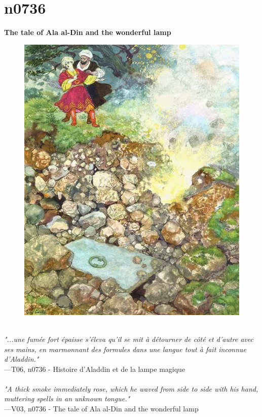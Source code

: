 \documentclass[../Carre_nights.tex]{subfiles}
\begin{document}
\newpage

\section{n0736}
\textbf{\Large{The tale of Ala al-Din and the wonderful lamp}} \\

\begin{figure}[ht]
\centering
\includegraphics[height=\figsize]{illustrations/volume_6/T06, n0736 - Histoire d'Aladdin et de la lampe magique.jpg}
\end{figure}

\textit{\\
"...une fumée fort épaisse s’éleva qu’il se mit à détourner de côté et d’autre avec ses mains, en marmonnant des formules dans une langue tout à fait inconnue d’Aladdin."} \\
—T06, n0736 - Histoire d'Aladdin et de la lampe magique \\~\\
\textit{"A thick smoke immediately rose, which he waved from side to side with his hand, muttering spells in an unknown tongue."} \\
—V03, n0736 - The tale of Ala al-Din and the wonderful lamp
\end{document}
